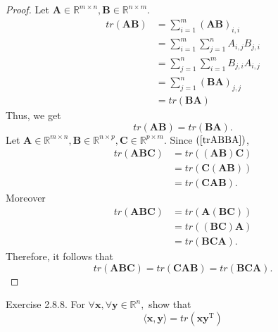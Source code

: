 \documentclass{article}
\theoremstyle{plain}
\begin{document}
\begin{proof}
	Let
	\begin{math}
		\bm{A} \in \mathbb{R}^{m \times n} , \bm{B} \in \mathbb{R}^{n \times m} .
	\end{math}
	\begin{equation*}
		\begin{split}
			tr(\bm{AB}) &= \sum_{i=1}^m (\bm{AB})_{i,i} \\
			&= \sum_{i=1}^m \sum_{j=1}^n A_{i,j} B_{j,i} \\
			&= \sum_{j=1}^n \sum_{i=1}^m B_{j,i} A_{i,j} \\
			&= \sum_{j=1}^n (\bm{BA})_{j,j} \\
			&= tr(\bm{BA})
		\end{split}
	\end{equation*}
	Thus, we get
	\begin{equation}
		\label{trABBA}
		tr(\bm{AB}) = tr(\bm{BA}) .
	\end{equation}
	Let $\bm{A} \in \mathbb{R}^{m \times n} , \bm{B} \in \mathbb{R}^{n \times p} , \bm{C} \in \mathbb{R}^{p \times m}$.
	Since $(\ref{trABBA})$,
	\begin{equation*}
		\begin{split}
			tr(\bm{ABC}) &= tr((\bm{AB}) \bm{C}) \\
			&= tr(\bm{C}(\bm{AB})) \\
			&= tr(\bm{CAB}) .
		\end{split}
	\end{equation*}
	Moreover
	\begin{equation*}
		\begin{split}
			tr(\bm{ABC}) &= tr(\bm{A}(\bm{BC})) \\
			&= tr((\bm{BC}) \bm{A}) \\
			&= tr(\bm{BCA}) .
		\end{split}
	\end{equation*}
	Therefore, it follows that
	\begin{equation*}
		tr(\bm{ABC}) = tr(\bm{CAB}) = tr(\bm{BCA}) .
	\end{equation*}
\end{proof}

\begin{itembox}[l]{Exercise 2.8.8.}
	For
	\begin{math}
		\forall \bm{x} , \forall \bm{y} \in \mathbb{R}^n ,
	\end{math}
	show that
	\begin{equation}
		\langle \bm{x} , \bm{y} \rangle = tr(\bm{x} \bm{y}^\mathrm{T})
	\end{equation}
\end{itembox}
\end{document}
